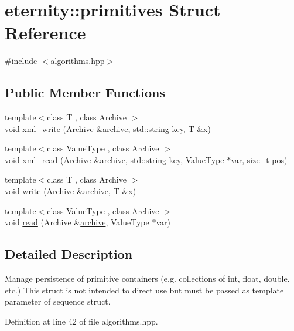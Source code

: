 \hypertarget{structeternity_1_1primitives}{}\section{eternity\+:\+:primitives Struct Reference}
\label{structeternity_1_1primitives}


{\ttfamily \#include $<$algorithms.\+hpp$>$}

\subsection*{Public Member Functions}
\begin{DoxyCompactItemize}
\item 
{\footnotesize template$<$class T , class Archive $>$ }\\void \hyperlink{structeternity_1_1primitives_af5a6a3550f36eb25ad9372989614f162}{xml\+\_\+write} (Archive \&\hyperlink{classeternity_1_1archive}{archive}, std\+::string key, T \&x)
\item 
{\footnotesize template$<$class Value\+Type , class Archive $>$ }\\void \hyperlink{structeternity_1_1primitives_af056cf9c18929b6ec47552e9cbb16b77}{xml\+\_\+read} (Archive \&\hyperlink{classeternity_1_1archive}{archive}, std\+::string key, Value\+Type $\ast$var, size\+\_\+t pos)
\item 
{\footnotesize template$<$class T , class Archive $>$ }\\void \hyperlink{structeternity_1_1primitives_ace523d3626457362731f78d6a8b3d325}{write} (Archive \&\hyperlink{classeternity_1_1archive}{archive}, T \&x)
\item 
{\footnotesize template$<$class Value\+Type , class Archive $>$ }\\void \hyperlink{structeternity_1_1primitives_a9770d350c89a97245bf15447586e40cb}{read} (Archive \&\hyperlink{classeternity_1_1archive}{archive}, Value\+Type $\ast$var)
\end{DoxyCompactItemize}


\subsection{Detailed Description}
Manage persistence of primitive containers (e.\+g. collections of int, float, double. etc.) This struct is not intended to direct use but must be passed as template parameter of sequence struct. 

Definition at line 42 of file algorithms.\+hpp.



